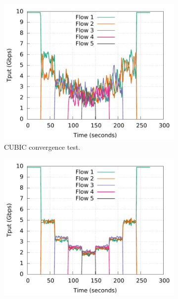 \begin{figure}[!t]
        \centering
        \begin{subfigure}[b]{0.45\textwidth}
                \centering
                \includegraphics[width=\textwidth]{acdctcp/figures/convergence/flowcontrolOFF/tcp_flowcontrolOFF_convergence.pdf}
                \caption{CUBIC convergence test.}
                \label{cubic_convergence}
        \end{subfigure}
        \begin{subfigure}[b]{0.45\textwidth}
                \centering
                \includegraphics[width=\textwidth]{acdctcp/figures/convergence/flowcontrolOFF/dctcp_flowcontrolOFF_convergence.pdf}

\end{subfigure}
\end{figure}
